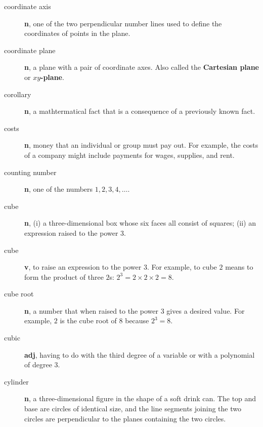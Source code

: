 \documentclass[10pt,]{book}
\newcommand{\terminology}[1]{\textbf{#1}}
\theoremstyle{plain}
\theoremstyle{definition}
\theoremstyle{definition}
\theoremstyle{definition}
\numberwithin{equation}{part}
\begin{document}
\begin{description}
\item[{coordinate axis}]\hypertarget{li-526}{}\terminology{n}, one of the two perpendicular number lines used to define the coordinates of points in the plane.%
\item[{coordinate plane}]\hypertarget{li-527}{}\terminology{n}, a plane with a pair of coordinate axes. Also called the \terminology{Cartesian plane} or \terminology{\(xy\)-plane}.%
\item[{corollary}]\hypertarget{li-528}{}\terminology{n}, a mathtermatical fact that is a consequence of a previously known fact.%
\item[{costs}]\hypertarget{li-529}{}\terminology{n}, money that an individual or group must pay out. For example, the costs of a company might include payments for wages, supplies, and rent.%
\item[{counting number}]\hypertarget{li-530}{}\terminology{n}, one of the numbers \(1, 2, 3, 4, \ldots\).%
\item[{cube}]\hypertarget{li-531}{}\terminology{n}, (i) a three-dimensional box whose six faces all consist of squares; (ii) an expression raised to the power \(3\).%
\item[{cube}]\hypertarget{li-532}{}\terminology{v}, to raise an expression to the power \(3\). For example, to cube \(2\) means to form the product of three \(2\)s: \(2^3 = 2 \times 2 \times 2 = 8\).%
\item[{cube root}]\hypertarget{li-533}{}\terminology{n}, a number that when raised to the power \(3\) gives a desired value. For example, \(2\) is the cube root of \(8\) because \(2^3 = 8\).%
\item[{cubic}]\hypertarget{li-534}{}\terminology{adj}, having to do with the third degree of a variable or with a polynomial of degree \(3\).%
\item[{cylinder}]\hypertarget{li-535}{}\terminology{n}, a three-dimensional figure in the shape of a soft drink can. The top and base are circles of identical size, and the line segments joining the two circles are perpendicular to the planes containing the two circles.%
\end{description}
%
\typeout{************************************************}
\typeout{************************************************}
\end{document}

